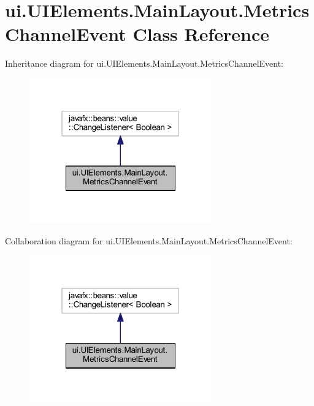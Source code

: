 \hypertarget{classui_1_1_u_i_elements_1_1_main_layout_1_1_metrics_channel_event}{}\section{ui.\+U\+I\+Elements.\+Main\+Layout.\+Metrics\+Channel\+Event Class Reference}
\label{classui_1_1_u_i_elements_1_1_main_layout_1_1_metrics_channel_event}


Inheritance diagram for ui.\+U\+I\+Elements.\+Main\+Layout.\+Metrics\+Channel\+Event\+:
\nopagebreak
\begin{figure}[H]
\begin{center}
\leavevmode
\includegraphics[width=223pt]{classui_1_1_u_i_elements_1_1_main_layout_1_1_metrics_channel_event__inherit__graph}
\end{center}
\end{figure}


Collaboration diagram for ui.\+U\+I\+Elements.\+Main\+Layout.\+Metrics\+Channel\+Event\+:
\nopagebreak
\begin{figure}[H]
\begin{center}
\leavevmode
\includegraphics[width=223pt]{classui_1_1_u_i_elements_1_1_main_layout_1_1_metrics_channel_event__coll__graph}
\end{center}
\end{figure}
